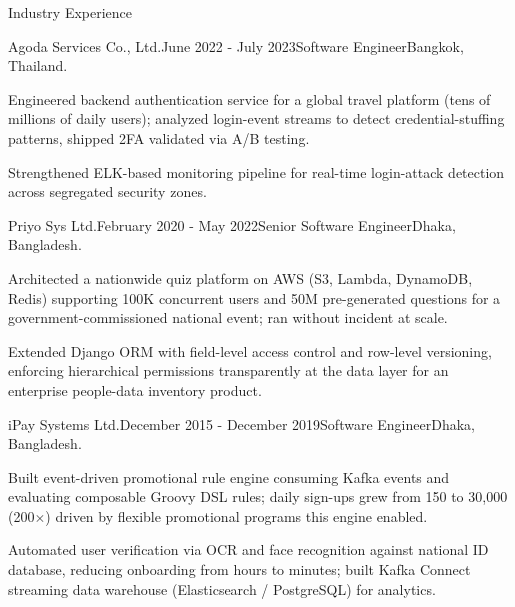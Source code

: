 \documentclass{resume} %
\begin{document}
\begin{rSection}{Industry Experience}

    \begin{rSubsection}{Agoda Services Co., Ltd.}{June 2022 - July 2023}{Software Engineer}{Bangkok, Thailand.}
        \item Engineered backend authentication service for a global travel platform (tens of millions of daily users);
              analyzed login-event streams to detect credential-stuffing patterns, shipped 2FA validated via A/B testing.
        \item Strengthened ELK-based monitoring pipeline for real-time login-attack detection across segregated security zones.
    \end{rSubsection}

    \begin{rSubsection}{Priyo Sys Ltd.}{February 2020 - May 2022}{Senior Software Engineer}{Dhaka, Bangladesh.}
        \item Architected a nationwide quiz platform on AWS (S3, Lambda, DynamoDB, Redis) supporting 100K concurrent
              users and 50M pre-generated questions for a government-commissioned national event; ran without incident at scale.
        \item Extended Django ORM with field-level access control and row-level versioning, enforcing hierarchical permissions
              transparently at the data layer for an enterprise people-data inventory product.
    \end{rSubsection}

    \begin{rSubsection}{iPay Systems Ltd.}{December 2015 - December 2019}{Software Engineer}{Dhaka, Bangladesh.}
        \item Built event-driven promotional rule engine consuming Kafka events and evaluating composable Groovy DSL rules;
              daily sign-ups grew from 150 to 30,000 (200$\times$) driven by flexible promotional programs this engine enabled.
        \item Automated user verification via OCR and face recognition against national ID database, reducing onboarding
              from hours to minutes; built Kafka Connect streaming data warehouse (Elasticsearch / PostgreSQL) for analytics.
    \end{rSubsection}

\end{rSection}
\end{document}
